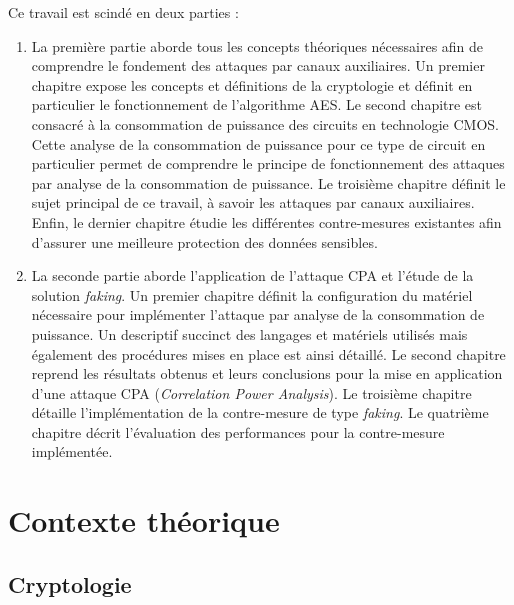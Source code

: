 \documentclass[oneside]{book}
\begin{document}
\hspace{-0.5cm}Ce travail est scindé en deux parties : 
\begin{enumerate}
\item La première partie aborde tous les concepts théoriques nécessaires afin de comprendre le fondement des attaques par canaux auxiliaires. Un premier chapitre expose les concepts et définitions de la cryptologie et définit en particulier le fonctionnement de l'algorithme AES. Le second chapitre est consacré à la consommation de puissance des circuits en technologie CMOS. Cette analyse de la consommation de puissance pour ce type de circuit en particulier permet de comprendre le principe de fonctionnement des attaques par analyse de la consommation de puissance. Le troisième chapitre définit le sujet principal de ce travail, à savoir les attaques par canaux auxiliaires. Enfin, le dernier chapitre étudie les différentes contre-mesures existantes afin d'assurer une meilleure protection des données sensibles. 
\item La seconde partie aborde l'application de l'attaque CPA et l'étude de la solution \textit{faking}. Un premier chapitre définit la configuration du matériel nécessaire pour implémenter l'attaque par analyse de la consommation de puissance. Un descriptif succinct des langages et matériels utilisés mais également des procédures mises en place est ainsi détaillé. Le second chapitre reprend les résultats obtenus et leurs conclusions pour la mise en application d'une attaque CPA (\textit{Correlation Power Analysis}). Le troisième chapitre détaille l'implémentation de la contre-mesure de type \textit{faking}. Le quatrième chapitre décrit l'évaluation des performances pour la contre-mesure implémentée.
\end{enumerate}


\newpage


\part{Contexte théorique}


\chapter{Cryptologie}
\label{chap:crypto}
\end{document}
